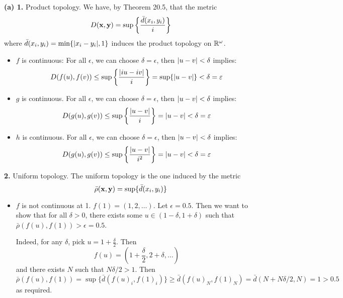 \documentclass[a4paper, 12pt]{article}
\begin{document}
\begin{solution}
    \textbf{(a) 1.} Product topology. We have, by Theorem 20.5, that the metric \begin{equation*}
    D(\mathbf{x}, \mathbf{y}) = \sup \left\{\frac{\bar{d}(x_i, y_i)}{i}\right\}
    \end{equation*}
    where $\bar{d}(x_i, y_i) = \min\{\lvert x_i - y_i\rvert, 1\} $ induces the product topology on $\mathbb{R}^\omega$. 
    
    \begin{itemize}
        \item $f$ is continuous: For all $\epsilon$, we can choose $\delta = \epsilon$, then $\lvert u - v\rvert < \delta$ implies: 
        \begin{equation*}
            D(f(u), f(v)) \leq \sup\left\{\frac{\lvert iu - iv\rvert}{i}\right\} = \sup\{\lvert u - v\rvert\} < \delta = \varepsilon
        \end{equation*}

        \item $g$ is continuous. For all $\epsilon$, we can choose $\delta = \epsilon$, then $\lvert u - v\rvert < \delta$ implies: 
        \begin{equation*}
            D(g(u), g(v)) \leq \sup\left\{\frac{\lvert u - v\rvert}{i}\right\} = \lvert u - v\rvert < \delta = \varepsilon
        \end{equation*}
        
        \item $h$ is continuous. For all $\epsilon$, we can choose $\delta = \epsilon$, then $\lvert u - v\rvert < \delta$ implies: 
        \begin{equation*}
            D(g(u), g(v)) \leq \sup\left\{\frac{\lvert u - v\rvert}{i^2}\right\} = \lvert u - v\rvert < \delta = \varepsilon
        \end{equation*}
    \end{itemize}    

\textbf{2.} Uniform topology. The uniform topology is the one induced by the metric \begin{equation*}
\bar{\rho}(\mathbf{x}, \mathbf{y}) = \sup\{\bar{d}(x_i, y_i)\}
\end{equation*}
\begin{itemize}
\item $f$ is not continuous at 1. $f(1) = (1, 2, \ldots)$. Let $\epsilon = 0.5$. Then we want to show that for all $\delta > 0$, there exists some $u \in (1 - \delta, 1 + \delta)$ such that $\bar{\rho}(f(u), f(1)) > \epsilon = 0.5$.

Indeed, for any $\delta$, pick $ u = 1 + \frac{\delta}{2}$. Then \begin{equation*}
f(u) = (1 + \frac{\delta}{2}, 2 + \delta, \ldots)
\end{equation*}
and there exists $N$ such that $N\delta/2 > 1$. Then \begin{equation*}
\bar{\rho}(f(u), f(1)) = \sup\{\bar{d}(f(u)_i, f(1)_i)\} \geq \bar{d}(f(u)_N, f(1)_N) = \bar{d}(N + N\delta/2, N) = 1 > 0.5
\end{equation*}
as required.


\end{itemize}
\end{solution}
\end{document}
